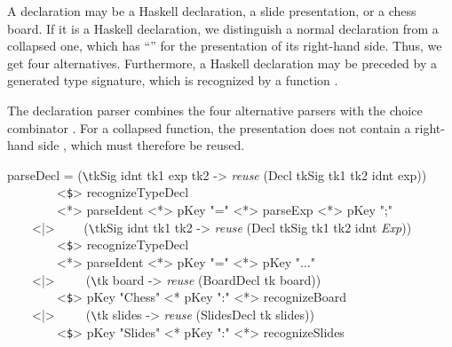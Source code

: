 

A declaration may be a Haskell declaration, a slide presentation, or a chess board. If it is a Haskell declaration, we distinguish a normal declaration from a collapsed one, which has ``'' for the presentation of its right-hand side. Thus, we get four alternatives. Furthermore, a Haskell declaration may be preceded by a generated type signature, which is recognized by a function .

The declaration parser combines the four alternative parsers with the choice combinator \p{<|>}. For a collapsed function, the presentation does not contain a right-hand side , which must therefore be reused. 

\ttfamily \begin{small} \begin{tabbing}
parseDecl = (\verb|\|tkSig idnt tk1 exp tk2 -> {\em reuse} (Decl tkSig tk1 tk2 idnt exp))\\
~~~~~~~~<\verb|$|> recognizeTypeDecl\\
~~~~~~~~<*> parseIdent <*> pKey "=" <*> parseExp <*> pKey ";"\\
~~~~<|>~~~~ (\verb|\|tkSig idnt tk1 tk2 -> {\em reuse} (Decl tkSig tk1 tk2 idnt {\em Exp}))\\
~~~~~~~~<\verb|$|> recognizeTypeDecl\\
~~~~~~~~<*> parseIdent <*> pKey "=" <*> pKey "..."\\
~~~~<|>~~~~~(\verb|\|tk board -> {\em reuse} (BoardDecl tk board))\\
~~~~~~~~<\verb|$|> pKey "Chess" <* pKey ":" <*> recognizeBoard\\
~~~~<|>~~~~~(\verb|\|tk slides -> {\em reuse} (SlidesDecl tk slides))\\
~~~~~~~~<\verb|$|> pKey "Slides" <* pKey ":" <*> recognizeSlides
\end{tabbing} \end{small} \rmfamily
{}



